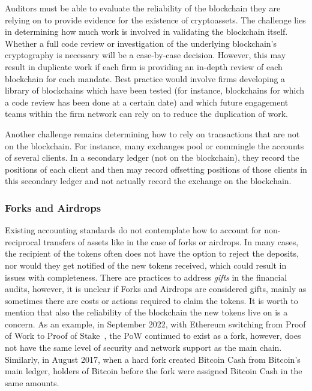 Auditors must be able to evaluate the reliability of the blockchain they are relying on to provide evidence for the existence of cryptoassets. The challenge lies in determining how much work is involved in validating the blockchain itself. Whether a full code review or investigation of the underlying blockchain's cryptography is necessary will be a case-by-case decision. However, this may result in duplicate work if each firm is providing an in-depth review of each blockchain for each mandate. Best practice would involve firms developing a library of blockchains which have been tested (for instance, blockchains for which a code review has been done at a certain date) and which future engagement teams within the firm network can rely on to reduce the duplication of work.

Another challenge remains determining how to rely on transactions that are not on the blockchain. For instance, many exchanges pool or commingle the accounts of several clients. In a secondary ledger (not on the blockchain), they record the positions of each client and then may record offsetting positions of those clients in this secondary ledger and not actually record the exchange on the blockchain.


\subsubsection{Forks and Airdrops} \label{sec:auditing:framework:existence:airdrops}

Existing accounting standards do not contemplate how to account for non-reciprocal transfers of assets like in the case of forks or airdrops. In many cases, the recipient of the tokens often does not have the option to reject the deposits, nor would they get notified of the new tokens received, which could result in issues with completeness. There are practices to address \textit{gifts} in the financial audits, however, it is unclear if Forks and Airdrops are considered gifts, mainly as sometimes there are costs or actions required to claim the tokens. It is worth to mention that also the reliability of the blockchain the new tokens live on is a concern. As an example, in September 2022, with Ethereum switching from Proof of Work to Proof of Stake~\cite{themerge}, the PoW continued to exist as a fork, however, does not have the same level of security and network support as the main chain. Similarly, in August 2017, when a hard fork created Bitcoin Cash from Bitcoin's main ledger, holders of Bitcoin before the fork were assigned Bitcoin Cash in the same amounts. 

